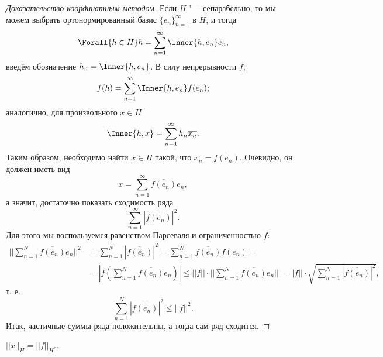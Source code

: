\documentclass[main]{subfiles}
\begin{document}
\begin{proof}[Доказательство координатным методом]
  Если \( H \) "--- сепарабельно,
  то мы можем выбрать
  ортонормированный базис \( {\{ e_n \}}_{n=1}^\infty \) в \( H \),
  и тогда
  \[
    \Forall{h \in H} h = \sum_{n = 1}^\infty \Inner{h, e_n} e_n,
  \]
  введём обозначение \( h_n = \Inner{h, e_n} \).
  В силу непрерывности \( f \),
  \[
    f(h) = \sum_{n=1}^\infty \Inner{h, e_n} f(e_n);
  \]
  аналогично, для произвольного \( x \in H \)
  \[
    \Inner{h, x} = \sum_{n=1}^\infty h_n \overline{x_n}.
  \]
  Таким образом, необходимо найти \( x \in H \)
  такой, что \( x_n = \overline{f(e_n)} \).
  Очевидно, он должен иметь вид
  \[
    x = \sum_{n=1}^\infty \overline{f(e_n)} e_n,
  \]
  а значит,
  достаточно показать сходимость ряда
  \[
    \sum_{n=1}^\infty \left| \overline{f(e_n)} \right|^2.
  \]
  Для этого мы воспользуемся равенством Парсеваля
  и ограниченностью \( f \):
  \begin{align}
    ||\sum_{n=1}^N \overline{f(e_n)} e_n||^2 &=
    \sum_{n=1}^N \left| \overline{f(e_n)} \right|^2 =
    \sum_{n=1}^N \overline{f(e_n)} f(e_n) = \\
    & = |f(\sum_{n=1}^N \overline{f(e_n)} e_n)| \le
    ||f|| \cdot ||\sum_{n=1}^N \overline{f(e_n)} e_n|| =
    ||f|| \cdot \sqrt{\sum_{n=1}^N \left| \overline{f(e_n)} \right|^2},
  \end{align}
  т. е.
  \[
    \sum_{n=1}^N \left| \overline{f(e_n)} \right|^2 \le ||f||^2.
  \]
  Итак, частичные суммы ряда положительны,
  а тогда сам ряд сходится.
\end{proof}
\begin{corollary}
  \( ||x||_H = ||f||_{H^*} \).
\end{corollary}

\end{document}
